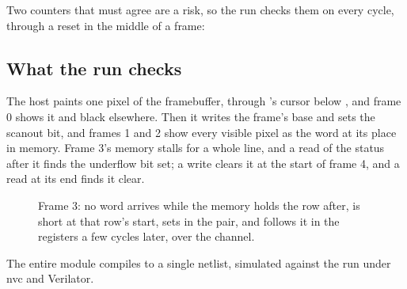Two counters that must agree are a risk, so the run checks them on
every cycle, through a reset in the middle of a frame:



\subsection{What the run checks}

The host paints one pixel of the framebuffer, through 's
cursor below , and frame 0 shows it and black elsewhere.
Then it writes the frame's base and sets the scanout bit, and frames
1 and 2 show every visible pixel as the word at its place in memory.
Frame 3's memory stalls for a whole line, and a read of the status
after it finds the underflow bit set; a write clears it at the start
of frame 4, and a read at its end finds it clear.

\begin{figure}[htbp]
\centering

\caption{Frame 3: no word arrives while the memory holds the row
after,  is short at that row's start,  sets in
the pair, and  follows it in the registers a few cycles
later, over the channel.}
\label{fig:x-scanvideo}
\end{figure}

The entire  module compiles to a single netlist,
simulated against the run under nvc and Verilator.






